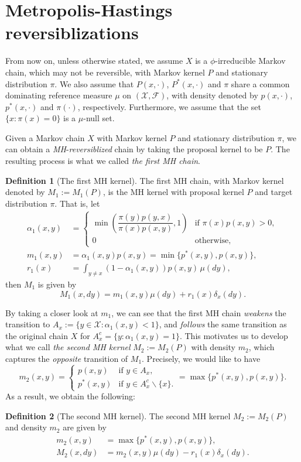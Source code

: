 \documentclass[12pt,a4]{amsart}
\numberwithin{equation}{section}
\theoremstyle{plain}
\theoremstyle{definition}
\newtheorem{definition}{Definition}[section]
\theoremstyle{remark}
\newcommand{\1}{\mathds{1}}
\begin{document}
\section{Metropolis-Hastings reversiblizations}\label{sec:MHr}

From now on, unless otherwise stated, we assume $X$ is a $\phi$-irreducible Markov chain, which may not be reversible, with Markov kernel $P$ and stationary distribution $\pi$. We also assume that $P(x,\cdot)$, $P^*(x,\cdot)$ and $\pi$ share a common dominating reference measure $\mu$ on $(\mathcal{X},\mathcal{F})$, with density denoted by $p(x,\cdot)$, $p^*(x,\cdot)$ and $\pi(\cdot)$, respectively. Furthermore, we assume that the set $\{x : \pi(x) = 0\}$ is a $\mu$-null set.

Given a Markov chain $X$ with Markov kernel $P$ and stationary distribution $\pi$, we can obtain a \textit{MH}-\textit{reversiblized} chain by taking the proposal kernel to be $P$. The resulting process is what we called \textit{the first MH chain}.

\begin{definition}[The first MH kernel]\label{def:M1}
	The first MH chain, with Markov kernel denoted by $M_1 := M_1(P)$, is the MH kernel with proposal kernel $P$ and target distribution $\pi$. That is, let
	\begin{align*}
	\alpha_1(x,y) &= \begin{cases} \min \left(\dfrac{\pi(y)p(y,x)}{\pi(x)p(x,y)},1 \right) &\mbox{if } \pi(x)p(x,y) > 0, \\
	0 & \mbox{otherwise,} \end{cases} \\
	m_1(x,y) &= \alpha_1(x,y) p(x,y) = \min\{p^*(x,y),p(x,y)\}, \\
	r_1(x) &= \int_{y \neq x} (1-\alpha_1(x,y)) p(x,y) \, \mu(dy) ,
	\end{align*}
	then $M_1$ is given by
	$$M_1(x,dy) = m_1(x,y) \mu(dy) + r_1(x)\delta_x(dy).$$
\end{definition}

By taking a closer look at $m_1$, we can see that the first MH chain \textit{weakens} the transition to $A_x := \{y \in \mathcal{X} : \alpha_1(x,y) < 1\}$, and \textit{follows} the same transition as the original chain $X$ for $A_x^c = \{y : \alpha_1(x,y) = 1\}$. This motivates us to develop what we call \textit{the second MH kernel} $M_2 := M_2(P)$ with density $m_2$, which captures the \textit{opposite} transition of $M_1$. Precisely, we would like to have
$$m_2(x,y) = \begin{cases} p(x,y) &\mbox{if } y \in A_x, \\
p^*(x,y) &\mbox{if } y \in A_x^c \backslash \{x\}. \end{cases} = \max\{p^*(x,y),p(x,y)\}.$$
As a result, we obtain the following:
\begin{definition}[The second MH kernel]\label{def:M2}
	The second MH kernel $M_2 := M_2(P)$ and density $m_2$ are given by
	\begin{align*}
	m_2(x,y) &= \max\{p^*(x,y),p(x,y)\}, \\
	M_2(x,dy) &= m_2(x,y) \mu(dy) - r_1(x)\delta_x(dy).
	\end{align*}
\end{definition}
\end{document}
